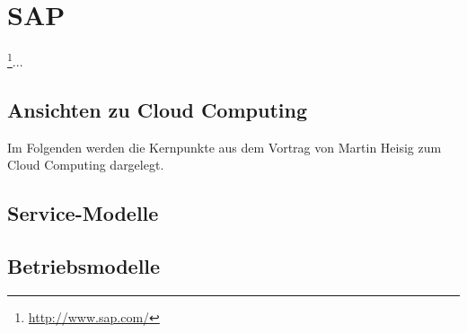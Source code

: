 \section{SAP}
\label{sec_sap}

\footnote{\url{http://www.sap.com/}}... 

\subsection{Ansichten zu Cloud Computing}
\label{sec_sap_general}

%

Im Folgenden werden die Kernpunkte aus dem Vortrag von Martin Heisig\cite{vortragSAP} zum Cloud Computing dargelegt.



\subsection{Service-Modelle}
\label{sec_sap_delivery}



\subsection{Betriebsmodelle}
\label{sec_sap_deployment}

